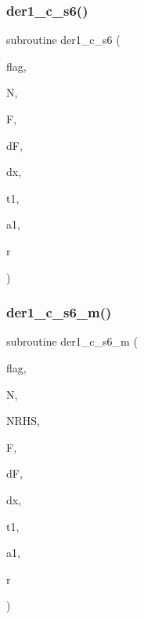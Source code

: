 \mbox{\label{ders__n_8f_a7b0700ad7724c3baa64e7112910cbf05}} 
\subsubsection{\texorpdfstring{der1\+\_\+c\+\_\+s6()}{der1\_c\_s6()}}
{\footnotesize\ttfamily subroutine der1\+\_\+c\+\_\+s6 (\begin{DoxyParamCaption}\item[{character$\ast$1}]{flag,  }\item[{integer}]{N,  }\item[{real, dimension(0\+:n)}]{F,  }\item[{real, dimension(n)}]{dF,  }\item[{real}]{dx,  }\item[{real, dimension(n,n)}]{t1,  }\item[{real, dimension(n,n+1)}]{a1,  }\item[{real, dimension(n,n+1)}]{r }\end{DoxyParamCaption})}

\mbox{\label{ders__n_8f_aa014445c484a7914447623a186b87c9a}} 
\subsubsection{\texorpdfstring{der1\+\_\+c\+\_\+s6\+\_\+m()}{der1\_c\_s6\_m()}}
{\footnotesize\ttfamily subroutine der1\+\_\+c\+\_\+s6\+\_\+m (\begin{DoxyParamCaption}\item[{character$\ast$1}]{flag,  }\item[{integer}]{N,  }\item[{}]{N\+R\+HS,  }\item[{real, dimension(0\+:n,nrhs)}]{F,  }\item[{real, dimension(n,nrhs)}]{dF,  }\item[{real}]{dx,  }\item[{real, dimension(n,n)}]{t1,  }\item[{real, dimension(n,n+1)}]{a1,  }\item[{real, dimension(n,n+1)}]{r }\end{DoxyParamCaption})}

